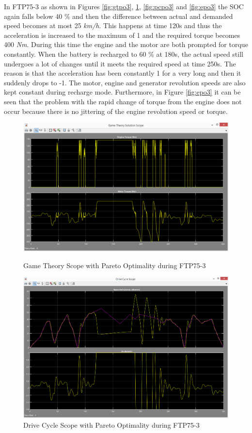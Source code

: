 In FTP75-3 as shown in Figures \ref{fig:gtpo3}, \ref{fig:dcpo3}, \ref{fig:pcpo3} and \ref{fig:epo3} the SOC again falls below 40 \% and then the difference between actual and demanded speed becomes at most 25 \textit{km/h}. This happens at time 120s and thus the acceleration is increased to the maximum of 1 and the required torque becomes 400 \textit{Nm}. During this time the engine and the motor are both prompted for torque constantly. When the battery is recharged to 60 \% at 180s, the actual speed still undergoes a lot of changes until it meets the required speed at time 250s. The reason is that the acceleration has been constantly 1 for a very long and then it suddenly drops to -1. The motor, engine and generator revolution speeds are also kept constant during recharge mode. Furthermore, in Figure \ref{fig:epo3} it can be seen that the problem with the rapid change of torque from the engine does not occur because there is no jittering of the engine revolution speed or torque.

\begin{figure}[hp]
\centering
\includegraphics[scale=0.45]{figures/Pareto/FTP75-3/gameTheory08Juni}
\caption{Game Theory Scope with Pareto Optimality during FTP75-3}
\label{fig:gtpo3}
\includegraphics[scale=0.41]{figures/Pareto/FTP75-3/driveCycle08Juni}
\caption{Drive Cycle Scope with Pareto Optimality during FTP75-3}
\label{fig:dcpo3}
\end{figure}

